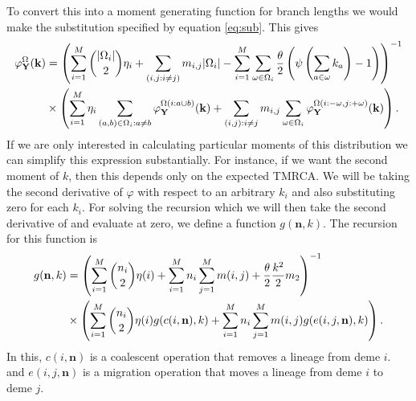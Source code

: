 To convert this into a moment generating function for branch lengths we would make the substitution specified by
equation \ref{eq:sub}. This gives 
\begin{align}
  \label{eq:gensub}
  \varphi_{\mathbf{Y}}^{\Omega}(\mathbf{k}) &=
  \left( \sum_{i=1}^M \binom{|\Omega_i|}{2}\eta_i  + \sum_{(i,j:i \neq j)} m_{i,j}|\Omega_i| -
  \sum_{i=1}^M \sum_{\omega \in \Omega_i} \frac{\theta}{2}\left( \psi\left(\sum_{a \in \omega}k_{a}\right) -1\right)\right)^{-1} \\
  &\times \left( \sum_{i=1}^M \eta_i \sum_{(a,b) \in \Omega_i:a \neq b}
  \varphi_{\mathbf{Y}}^{\Omega(i:a \cup b)}(\mathbf{k}) + 
  \sum_{(i,j):i\neq j}m_{i,j}\sum_{\omega \in \Omega_i} \varphi_{\mathbf{Y}}^{\Omega\left( i :-\omega, j: + \omega \right)}(\mathbf{k})\right).
\end{align}
If we are only interested in calculating particular moments of this distribution we can simplify this expression
substantially. For instance, if we want the second moment of $k$, then this depends only on the expected TMRCA. We will
be taking the second derivative of $\varphi$ with respect to an arbitrary $k_i$ and also substituting zero for each
$k_i$. For solving the recursion which we will then take the second derivative of and evaluate at zero, we define a 
function $g(\mathbf{n}, k)$. The recursion for this function is 
\begin{align}
  \label{eq:grecur}
  g(\mathbf{n}, k) &= \left( \sum_{i=1}^M \binom{n_i}{2}\eta(i) + \sum_{i=1}^Mn_i\sum_{j=1}^Mm(i,j) + 
    \frac{\theta}{2} \frac{k^2}{2}m_2 \right)^{-1} \nonumber \\
  &\times \left( \sum_{i=1}^M \binom{n_i}{2} \eta(i) g(c(i,\mathbf{n}), k) + 
  \sum_{i=1}^Mn_i\sum_{j=1}^Mm(i,j)g(e(i,j,\mathbf{n}),k)\right).
\end{align}
In this, $c(i,\mathbf{n})$ is a coalescent operation that removes a lineage from deme $i$. and $e(i,j,\mathbf{n})$ is a
migration operation that moves a lineage from deme $i$ to deme $j$. 

